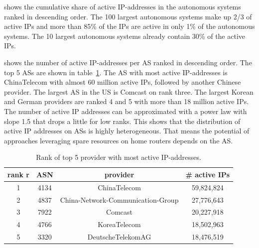  shows the cumulative share of active IP-addresses in the autonomous systems ranked in descending order.
The 100 largest autonomous systems make up 2/3 of active IPs and more than 85\% of the IPs are active in only 1\% of the autonomous systems. The 10 largest autonomous systems already contain 30\% of the active IPs.

 shows the number of active IP-addresses per AS ranked in descending order.
The top 5 ASs are shown in table~\ref{tab:asrank}.
The AS with most active IP-addresses is ChinaTelecom with almost 60 million active IPs, followed by another Chinese provider.
The largest AS in the US is Comcast on rank three.
The largest Korean and German providers are ranked 4 and 5 with more than 18 million active IPs.
The number of active IP addresses can be approximated with a power law with slope 1.5 that drops a little for low ranks.
This shows that the distribution of active IP addresses on ASs is highly heterogeneous.
That means the potential of approaches leveraging spare resources on home routers depends on the AS.

\begin{table}[tb]
\centering
\caption{Rank of top 5 provider with most active IP-addresses.}
\label{tab:asrank}
\begin{tabular}{|c|c|c|c|}
\hline
rank r & ASN & provider & \# active IPs  \\
\hline
1 & 4134 & ChinaTelecom & 59,824,824 \\
2 & 4837 & China-Network-Communication-Group & 27,776,643 \\
3 & 7922 & Comcast & 20,227,918 \\
4 & 4766 & KoreaTelecom & 18,502,963 \\
5 & 3320 & DeutscheTelekomAG & 18,476,519 \\
\hline
\end{tabular}
\end{table}
